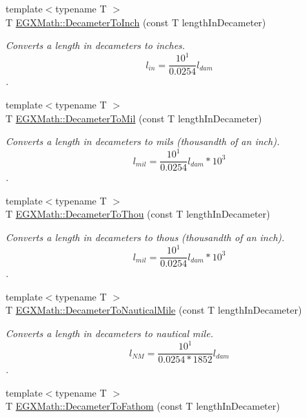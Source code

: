 \begin{DoxyCompactItemize}
{\footnotesize template$<$typename T $>$ }\\T \mbox{\hyperlink{group___e_g_x_math-_conversions-_length_conversions-_s_i-_decameter-_imperial_ga246ab50e821640008d965b5690226df5}{E\+G\+X\+Math\+::\+Decameter\+To\+Inch}} (const T length\+In\+Decameter)
\begin{DoxyCompactList}\small\item\em Converts a length in decameters to inches. \[ l_{in}= \frac{10^{1}}{0.0254} l_{dam} \]. \end{DoxyCompactList}\item 
{\footnotesize template$<$typename T $>$ }\\T \mbox{\hyperlink{group___e_g_x_math-_conversions-_length_conversions-_s_i-_decameter-_imperial_gaee77251b6c2f2e8e0feae0032e80e0c3}{E\+G\+X\+Math\+::\+Decameter\+To\+Mil}} (const T length\+In\+Decameter)
\begin{DoxyCompactList}\small\item\em Converts a length in decameters to mils (thousandth of an inch). \[ l_{mil}= \frac{10^{1}}{0.0254} l_{dam} * 10^{3} \]. \end{DoxyCompactList}\item 
{\footnotesize template$<$typename T $>$ }\\T \mbox{\hyperlink{group___e_g_x_math-_conversions-_length_conversions-_s_i-_decameter-_imperial_ga4f21f4b1df62d1d63f46849c4f38d56b}{E\+G\+X\+Math\+::\+Decameter\+To\+Thou}} (const T length\+In\+Decameter)
\begin{DoxyCompactList}\small\item\em Converts a length in decameters to thous (thousandth of an inch). \[ l_{mil}= \frac{10^{1}}{0.0254} l_{dam} * 10^{3} \]. \end{DoxyCompactList}\item 
{\footnotesize template$<$typename T $>$ }\\T \mbox{\hyperlink{group___e_g_x_math-_conversions-_length_conversions-_s_i-_decameter-_nautical_ga099c662953d7c82d538755bd699993b1}{E\+G\+X\+Math\+::\+Decameter\+To\+Nautical\+Mile}} (const T length\+In\+Decameter)
\begin{DoxyCompactList}\small\item\em Converts a length in decameters to nautical mile. \[ l_{NM}= \frac{10^{1}}{0.0254 * 1852} l_{dam} \]. \end{DoxyCompactList}\item 
{\footnotesize template$<$typename T $>$ }\\T \mbox{\hyperlink{group___e_g_x_math-_conversions-_length_conversions-_s_i-_decameter-_nautical_ga26e58af8b0bdc9bfb22635741a498217}{E\+G\+X\+Math\+::\+Decameter\+To\+Fathom}} (const T length\+In\+Decameter)

\end{DoxyCompactItemize}
